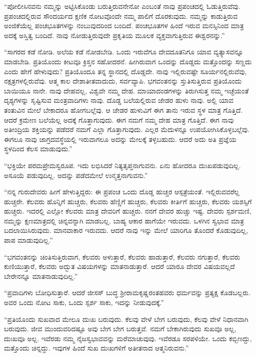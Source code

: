  “ಪೋಲೀಸಿನವನು ನಮ್ಮನ್ನು ಅಟ್ಟಿಸಿಕೊಂಡು ಬರುತ್ತಿರುವನೇನೋ ಎಂಬಂತೆ ನಾವು ಪ್ರಪಂಚದಲ್ಲಿ ಓಡುತ್ತಿರುವೆವು. ಪ್ರಪಂಚದಲ್ಲಿರುವ ಸೌಂದರ್ಯದ ಕ್ಷಣಿಕ ನೋಟವೊಂದೇ ನಮ್ಮ ಪಾಲಿಗೆ ದೊರಕುವುದು. ನಮ್ಮನ್ನು ಕಾಡುತ್ತಿರುವ ಅಂಜಿಕೆಯೆಲ್ಲ ಪಂಚಭೂತಗಳನ್ನು ನಂಬುವುದರಿಂದ ಬಂದಿದೆ. ಪಂಚಭೂತಗಳ ಹಿಂದೆ ಇರುವ ಮನಸ್ಸಿನಿಂದ ಮಾತ್ರ ಅದಕ್ಕೆ ಅಸ್ತಿತ್ವ ಬಂದಿದೆ. ನಾವು ನೋಡುತ್ತಿರುವುದೇ ಪ್ರಕೃತಿಯ ಮೂಲಕ ವ್ಯಕ್ತವಾಗುತ್ತಿರುವ ಈಶ್ವರನನ್ನು.” 

 “ಸಾಗರದ ಕಡೆ ನೋಡಿ. ಅಲೆಯ ಕಡೆ ನೋಡಬೇಡಿ. ಒಂದು ಇರುವೆಗೂ ದೇವದೂತನಿಗೂ ಯಾವ ವ್ಯತ್ಯಾಸವನ್ನೂ ಮಾಡಬೇಡಿ. ಪ್ರತಿಯೊಂದು ಕೀಟವೂ ಕ್ರಿಸ್ತನ ಸಹೋದರನೆ. ಹೀಗಿರುವಾಗ ಒಂದನ್ನು ದೊಡ್ಡದು ಮತ್ತೊಂದನ್ನು ಸಣ್ಣದು ಎಂದು ಹೇಗೆ ಹೇಳುವುದು? ಪ್ರತಿಯೊಂದೂ ತನ್ನ ಸ್ಥಾನದಲ್ಲಿ ದೊಡ್ಡದೇ. ನಾವು ಇಲ್ಲಿರುವಷ್ಟೇ ಸೂರ್ಯನಲ್ಲಿರುವೆವು, ನಕ್ಷತ್ರಗಳಲ್ಲಿರುವೆವು. ಆತ್ಮ ಕಾಲ ದೇಶಾತೀತವಾದುದು, ಸರ್ವವ್ಯಾಪಿ. ಭಗವಂತನನ್ನು ಸ್ತುತಿಸುತ್ತಿರುವ ಪ್ರತಿಯೊಂದು ಬಾಯಿಯೂ ನಾನೇ. ನಾವು ದೇಹವಲ್ಲ, ವಿಶ್ವವೇ ನಮ್ಮ ದೇಹ. ಮಾಯಾದಂಡಗಳನ್ನು ತಿರುಗಿಸುತ್ತ ನಮ್ಮ ಇಚ್ಛೆಯಂತೆ ದೃಶ್ಯಗಳನ್ನು ಸೃಷ್ಟಿಸುವ ಮಂತ್ರವಾದಿಗಳು ನಾವು. ದೊಡ್ಡ ಬಲೆಯಲ್ಲಿರುವ ಜೇಡರ ಹುಳು ನಾವು. ಅಲ್ಲಿ ಯಾವ ತಂತುವಿನ ಮೇಲೆ ಬೇಕಾದರೂ ಹೋಗಬಲ್ಲೆವು. ಆ ಜೇಡರ ಹುಳುವಿಗೆ ಈಗ ತಾನು ಇರುವ ಸ್ಥಳ ಮಾತ್ರ ಗೊತ್ತಿದೆ. ಆದರೆ ಕ್ರಮೇಣ ಬಲೆಯೆಲ್ಲ ಅದಕ್ಕೆ ಗೊತ್ತಾಗುವುದು. ಈಗ ನಮಗೆ ನಮ್ಮ ದೇಹ ಮಾತ್ರ ಗೊತ್ತಿದೆ. ಈಗ ನಾವು ಅತೀಂದ್ರಿಯ ಶಕ್ತಿಯನ್ನು ಪಡೆದರೆ ನಮಗೆ ಎಲ್ಲಾ ಗೊತ್ತಾಗುವುದು. ಎಲ್ಲರ ಮೆದುಳನ್ನೂ ಉಪಯೋಗಿಸಿಕೊಳ್ಳಬಲ್ಲೆವು. ಈಗಲೂ ನಾವು ಜಾಗ್ರದವಸ್ಥೆಯಲ್ಲಿ ಇರುವಾಗಲೂ ಅದನ್ನು ಮೇಲಕ್ಕೆ ತಳ್ಳಬಹುದು. ಆದರೆ ಅದು ಅತಿ ಪ್ರಜ್ಞೆಯ ಸ್ಥಳದಿಂದ ಕೆಲಸ ಮಾಡುವುದು.” 

 “ಭಕ್ತಿಯೇ ಪರಮಪ್ರೇಮಸ್ವರೂಪ. ಇದು ಲಭಿಸಿದರೆ ನಿತ್ಯತೃಪ್ತನಾಗುವನು. ಏನು ಹೋದರೂ ದುಃಖಪಡುವುದಿಲ್ಲ. ಅಸೂಯೆ ಪಡುವುದಿಲ್ಲ. ಅದನ್ನು ಪಡೆದಮೇಲೆ ಉನ್ಮತ್ತನಾಗುವನು.” 

 “ನನ್ನ ಗುರುದೇವರು ಹೀಗೆ ಹೇಳುತ್ತಿದ್ದರು: ಈ ಪ್ರಪಂಚ ಒಂದು ದೊಡ್ಡ ಹುಚ್ಚರ ಆಸ್ಪತ್ರೆಯಂತೆ. ಇಲ್ಲಿರುವವರೆಲ್ಲ ಹುಚ್ಚರೇ. ಕೆಲವರು ಹೊನ್ನಿಗೆ ಹುಚ್ಚರು, ಕೆಲವರು ಹೆಣ್ಣಿಗೆ ಹುಚ್ಚರು, ಕೆಲವರು ಕೀರ್ತಿಗೆ ಹುಚ್ಚರು, ಕೆಲವರು ಯಶಸ್ಸಿಗೆ ಹುಚ್ಚರು. ಇದರಲ್ಲಿ ಎಲ್ಲೋ ಕೆಲವರು ಮಾತ್ರ ದೇವರಿಗೆ ಹುಚ್ಚರು. ನನಗೆ ದೇವರ ಹುಚ್ಚು ಇಷ್ಟ. ದೇವರು ಸ್ಪರ್ಶಮಣಿ, ನಮ್ಮನ್ನು ಕ್ಷಣಮಾತ್ರದಲ್ಲಿ ಚಿನ್ನವನ್ನಾಗಿ ಮಾಡಬಲ್ಲ. ಬಾಹ್ಯ ಆಕಾರ ಹಾಗೆಯೇ ಇರುವದು. ಒಳಗಿನ ಸ್ವಭಾವ ಮಾತ್ರ ಬದಲಾಯಿಸಿರುವುದು. ಮಾನವಾಕಾರ ಇರುವದು. ಆದರೆ ನಾವು ಇನ್ನು ಮೇಲೆ ಯಾರಿಗೂ ತೊಂದರೆ ಕೊಡುವುದಿಲ್ಲ, ಪಾಪ ಮಾಡುವುದಿಲ್ಲ.” 

 “ಭಗವಂತನನ್ನು ಚಿಂತಿಸುತ್ತಿರುವಾಗ, ಕೆಲವರು ಅಳುತ್ತಾರೆ, ಕೆಲವರು ಹಾಡುತ್ತಾರೆ, ಕೆಲವರು ನಗುತ್ತಾರೆ, ಕೆಲವರು ಕುಣಿಯುತ್ತಾರೆ, ಕೆಲವರು ಅದ್ಭುತ ವಿಷಯಗಳನ್ನು ಮಾತನಾಡುತ್ತಾರೆ. ಆದರೆ ಯಾರೂ ದೇವರ ವಿಷಯವಲ್ಲದೆ ಬೇರೇನನ್ನೂ ಮಾತನಾಡುವುದಿಲ್ಲ.” 

 “ಪ್ರವಾದಿಗಳು ಬೋಧಿಸುತ್ತಾರೆ. ಆದರೆ ಜೀಸಸ್ ಬುದ್ಧ ಶ‍್ರೀರಾಮಕೃಷ್ಣರಂತಹವರು ಧರ್ಮವನ್ನು ಪ್ರತ್ಯಕ್ಷ ಕೊಡಬಲ್ಲರು. ಅವರ ಒಂದು ನೋಟ ಸಾಕು, ಒಂದು ಸ್ಪರ್ಶ ಸಾಕು, ಇದನ್ನು ನೀಡುವುದಕ್ಕೆ.” 

 “ಪ್ರತಿಯೊಂದು ಸುಖವಾದ ಮೇಲೂ ದುಃಖ ಬರುವುದು. ಕೆಲವು ವೇಳೆ ಬೇಗ ಬರುವುದು, ಕೆಲವು ವೇಳೆ ನಿಧಾನವಾಗಿ ಬರುವುದು. ಜೀವ ಮುಂದುವರಿದಷ್ಟೂ ಅವು ಬೇಗ ಬೇಗ ಬರುತ್ತವೆ. ನಮಗೆ ಬೇಕಾಗಿರುವುದು ಸುಖವೂ ಅಲ್ಲ, ದುಃಖವೂ ಅಲ್ಲ. ಇವೆರಡು ನಮ್ಮ ನೈಜಸ್ವಭಾವವನ್ನು ಮರೆಮಾಚುವುವು. ಇವೆರಡೂ ಸರಪಳಿಯೇ. ಒಂದು ಕಬ್ಬಿಣದ್ದು, ಮತ್ತೊಂದು ಚಿನ್ನದ್ದು. ಇವುಗಳ ಹಿಂದೆ ಸುಖ ದುಃಖಗಳಿಗೆ ಅತೀತನಾದ ಆತ್ಮನಿರುವನು.” 

